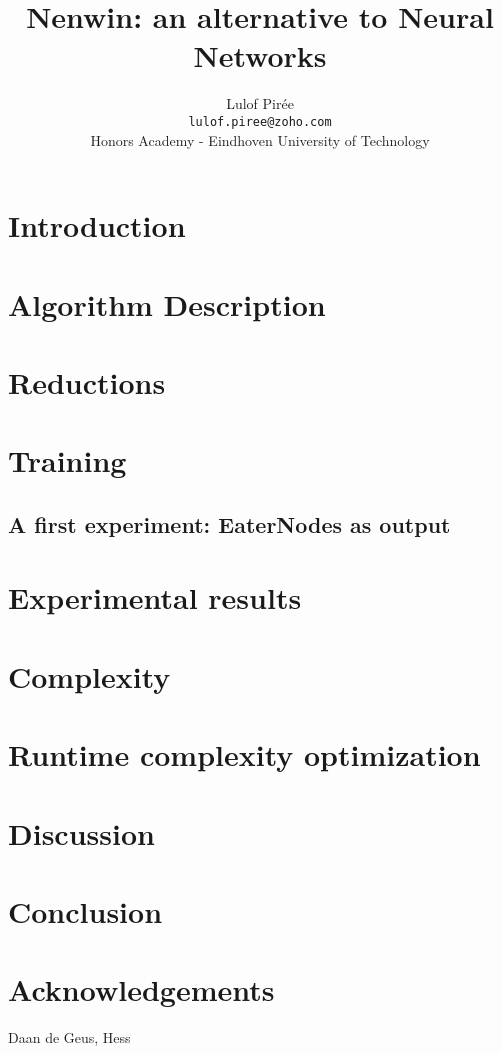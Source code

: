 \documentclass{scrartcl}
\title{Nenwin: an alternative to Neural Networks}
\author{Lulof Pirée\\\footnotesize\texttt{lulof.piree@zoho.com}\\\small{Honors Academy - Eindhoven University of Technology}\\}
\newcommand{\hl}[1]{{\color{red}#1}} %
\begin{document}
    \maketitle
    
    
    
    \section{Introduction}
    
    
    \section{Algorithm Description}
        
    
    \section{Reductions}
    
    
    \section{Training}
    
    
    \subsection{A first experiment: EaterNodes as output}
    
    
    \section{Experimental results}
    
    
    \section{Complexity}
    
    
    \section{Runtime complexity optimization}
    

    \section{Discussion}
    
    
    \section{Conclusion}
    
    
    \section{Acknowledgements}
    \hl{Daan de Geus, Hess}
    \printbibliography[
    heading=bibintoc,
    title={References}
    ]
    
    \appendix
    
    
\end{document}
